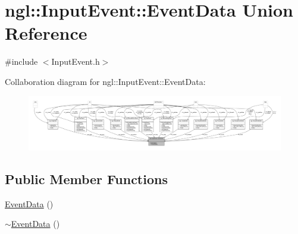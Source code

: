 \hypertarget{unionngl_1_1_input_event_1_1_event_data}{}\section{ngl\+:\+:Input\+Event\+:\+:Event\+Data Union Reference}
\label{unionngl_1_1_input_event_1_1_event_data}


{\ttfamily \#include $<$Input\+Event.\+h$>$}



Collaboration diagram for ngl\+:\+:Input\+Event\+:\+:Event\+Data\+:
\nopagebreak
\begin{figure}[H]
\begin{center}
\leavevmode
\includegraphics[width=350pt]{unionngl_1_1_input_event_1_1_event_data__coll__graph}
\end{center}
\end{figure}
\subsection*{Public Member Functions}
\begin{DoxyCompactItemize}
\item 
\mbox{\hyperlink{unionngl_1_1_input_event_1_1_event_data_a0466d57921b2bc4bacb2d0edf6a56eba}{Event\+Data}} ()
\item 
\mbox{\hyperlink{unionngl_1_1_input_event_1_1_event_data_a5fa55fcf575e37c4b6fad92010eecca0}{$\sim$\+Event\+Data}} ()
\end{DoxyCompactItemize}
